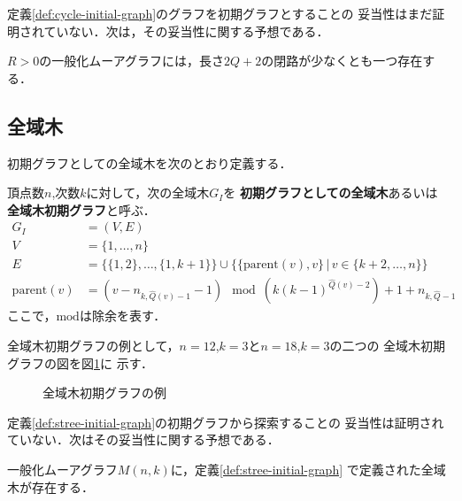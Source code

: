 定義\ref{def:cycle-initial-graph}のグラフを初期グラフとすることの
妥当性はまだ証明されていない．次は，その妥当性に関する予想である．

\begin{conjecture}\rm
  \label{conj:gmg-cycle}
  $R>0$の一般化ムーアグラフには，長さ$2Q+2$の閉路が少なくとも一つ存在する．
\end{conjecture}

\subsection{全域木}
\label{subsect:initial-spanning-tree}
初期グラフとしての全域木を次のとおり定義する．
\begin{definition}[初期グラフとしての全域木]\rm
  \label{def:stree-initial-graph}
  頂点数$n$,次数$k$に対して，次の全域木$G_I$を
  \textbf{初期グラフとしての全域木}あるいは
  \textbf{全域木初期グラフ}と呼ぶ．
  \begin{equation}
    \begin{aligned}
      G_I&=(V,E) \\
      V&=\{1,\ldots,n\} \\
      E&=\{\{1,2\},\ldots,\{1,k+1\}\}\cup
      \{\{\text{parent}(v),v\}\,|\,v\in \{k+2,\ldots,n\}\}  \\
      \text{parent}(v)&=
      (v-n_{k,\hat{Q}(v)-1}-1)\mod(k(k-1)^{\hat{Q}(v)-2})+1+n_{k,\hat{Q}-1}
    \end{aligned}
  \end{equation}
  ここで，$\text{mod}$は除余を表す．
\end{definition}
全域木初期グラフの例として，$n=12$,$k=3$と$n=18$,$k=3$の二つの
全域木初期グラフの図を図\ref{fig:initial-spanning-tree-example}に
示す．

\begin{figure}
  \centering
  \hfill
  \caption{全域木初期グラフの例}
  \label{fig:initial-spanning-tree-example}
\end{figure}

定義\ref{def:stree-initial-graph}の初期グラフから探索することの
妥当性は証明されていない．次はその妥当性に関する予想である．
\begin{conjecture}\rm
  \label{conj:spanning-tree}
  一般化ムーアグラフ$M(n,k)$に，定義\ref{def:stree-initial-graph}
  で定義された全域木が存在する．
\end{conjecture}

